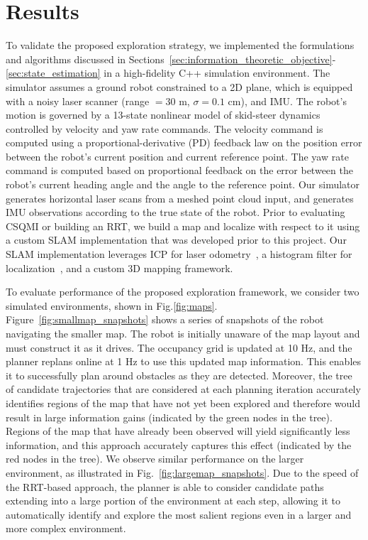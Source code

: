 \section{Results}
\label{sec:results}

To validate the proposed exploration strategy, we implemented the formulations
and algorithms discussed in Sections~\ref{sec:information_theoretic_objective}-\ref{sec:state_estimation}
in a high-fidelity C++ simulation environment. The simulator assumes a ground robot
constrained to a 2D plane, which is equipped with a noisy laser scanner (range $
= 30$ m, $\sigma = 0.1$ cm), and IMU. The robot's motion is governed by a 13-state nonlinear model of skid-steer dynamics controlled by velocity and yaw rate commands. The velocity command is computed using a proportional-derivative (PD) feedback law on the position error between the robot's current position and current reference point. The yaw rate command is computed based on proportional feedback on the error between the robot's current heading angle and the angle to the reference point. Our simulator generates horizontal laser scans
from a meshed point cloud input, and generates IMU observations according to the true
state of the robot. Prior to evaluating CSQMI or building an RRT, we build a map
and localize with respect to it using a custom SLAM implementation that was
developed prior to this project. Our SLAM implementation leverages ICP for laser
odometry~\cite{pomerleau2013comparing}, a histogram filter for
localization~\cite{thrun2005probabilistic}, and a custom 3D mapping framework.


To evaluate performance of the proposed exploration framework, we consider two simulated environments, shown in Fig.\ref{fig:maps}. Figure~\ref{fig:smallmap_snapshots} shows a series of snapshots of the robot navigating the smaller map. The robot is initially unaware of the map layout and must construct it as it drives. The occupancy grid is updated at 10 Hz, and the planner replans online at 1 Hz to use this updated map information. This enables it to successfully plan around obstacles as they are detected. Moreover, the tree of candidate trajectories that are considered at each planning iteration accurately identifies regions of the map that have not yet been explored and therefore would result in large information gains (indicated by the green nodes in the tree). Regions of the map that have already been observed will yield significantly less information, and this approach accurately captures this effect (indicated by the red nodes in the tree). We observe similar performance on the larger environment, as illustrated in Fig.~\ref{fig:largemap_snapshots}. Due to the speed of the RRT-based approach, the planner is able to consider candidate paths extending into a large portion of the environment at each step, allowing it to automatically identify and explore the most salient regions even in a larger and more complex environment.

